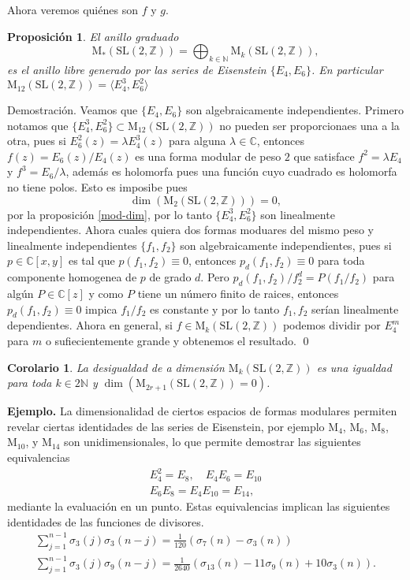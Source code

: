 \documentclass[letterpaper]{article}
\newtheorem{prop}[teorema]{Proposici\'on}
\newtheorem{cor}[teorema]{Corolario}
\newcommand{\nat}{\ensuremath{ \mathbb N }}
\newcommand{\eje}{{\noindent \sc \textbf{Ejemplo. }}}
\newcommand{\dem}{{\noindent \sc Demostraci\'on. }}
\newcommand{\co}{\ensuremath{\mathbb C }}
\newcommand{\slz}{\ensuremath{\mathrm{SL}(2,\mathbb Z) }}
\newcommand{\mdlr}{\ensuremath{\mathrm{M}}}
\begin{document}
Ahora veremos quiénes son \(f\) y \(g\).
\begin{prop}
El anillo graduado
\[
    \mdlr_{*}(\slz)=\bigoplus_{k\in\nat}\mdlr_k(\slz),
\]
es el anillo libre generado por las series de Eisenstein \(\{E_4,E_6\}\). En particular \(\mdlr_{12}(\slz)=\langle E_4^{3},E_6^{2}\rangle\)
\end{prop}
\dem Veamos que \(\{E_4,E_6\}\) son algebraicamente independientes. Primero notamos que \(\{E_4^{3},E_6^{2}\}\subset\mdlr_{12}(\slz)\) no pueden ser proporcionaes una a la otra, pues si \(E_6^2(z)=\lambda E_4^3(z)\) para alguna \(\lambda\in\co\), entonces \(f(z)=E_6(z)/E_4(z)\) es una forma modular de peso \(2\) que satisface \(f^2=\lambda E_4\) y \(f^3=E_6/\lambda\), además es holomorfa pues una función cuyo cuadrado es holomorfa no tiene polos. Esto es imposibe pues
\[
    \dim(\mdlr_2(\slz))=0,
\]
\noindent por la proposición \ref{mod-dim}, por lo tanto \(\{E_4^{3},E_6^{2}\}\) son linealmente independientes. Ahora cuales quiera dos formas moduares del mismo peso y linealmente independientes \(\{f_1,f_2\}\) son algebraicamente independientes, pues si \(p\in\co[x,y]\) es tal que \(p(f_1,f_2)\equiv0\), entonces \(p_d(f_1,f_2)\equiv0\) para toda componente homogenea de \(p\) de grado \(d\). Pero \(p_d(f_1,f_2)/f_2^d=P(f_1/f_2)\) para algún \(P\in\co[z]\) y como \(P\) tiene un número finito de raices, entonces \(p_d(f_1,f_2)\equiv0\) impica \(f_1/f_2\) es constante y por lo tanto \(f_1,f_2\) serían linealmente dependientes. Ahora en general, si \(f\in\mdlr_k(\slz)\) podemos dividir por \(E_4^m\) para \(m\) o sufiecientemente grande y obtenemos el resultado.
\qed
\begin{cor}
La desigualdad de a dimensión \(\mdlr_k(\slz)\) es una igualdad para toda \(k\in2\nat\) y \(\dim(\mdlr_{2r+1}(\slz)=0)\).
\end{cor}
\eje La dimensionalidad de ciertos espacios de formas modulares permiten revelar ciertas identidades de las series de Eisenstein, por ejemplo \(\mdlr_4\), \(\mdlr_6\), \(\mdlr_{8}\), \(\mdlr_{10}\), y \(\mdlr_{14}\) son unidimensionales, lo que permite demostrar las siguientes equivalencias
\begin{align*}
E_4^2=E_8,\quad E_4E_6=E_{10}\\
E_6E_8=E_4E_{10}=E_{14},
\end{align*}
\noindent mediante la evaluación en un punto. Estas equivalencias implican las siguientes identidades de las funciones de divisores.
\begin{align*}
\sum_{j=1}^{n-1}\sigma_3(j)\sigma_3(n-j)=\frac{1}{120}(\sigma_7(n)-\sigma_3(n))\\
\sum_{j=1}^{n-1}\sigma_3(j)\sigma_9(n-j)=\frac{1}{2640}(\sigma_{13}(n)-11\sigma_9(n)+10\sigma_3(n)).
\end{align*}
\end{document}
